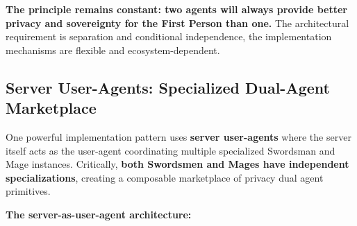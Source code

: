 \documentclass[11pt,a4paper]{article}
\theoremstyle{definition}
\begin{document}
\textbf{The principle remains constant: two agents will always provide better privacy and sovereignty for the First Person than one.} The architectural requirement is separation and conditional independence, the implementation mechanisms are flexible and ecosystem-dependent.

\subsection{Server User-Agents: Specialized Dual-Agent Marketplace}

One powerful implementation pattern uses \textbf{server user-agents} where the server itself acts as the user-agent coordinating multiple specialized Swordsman and Mage instances. Critically, \textbf{both Swordsmen and Mages have independent specializations}, creating a composable marketplace of privacy dual agent primitives.

\textbf{The server-as-user-agent architecture:}
\end{document}
